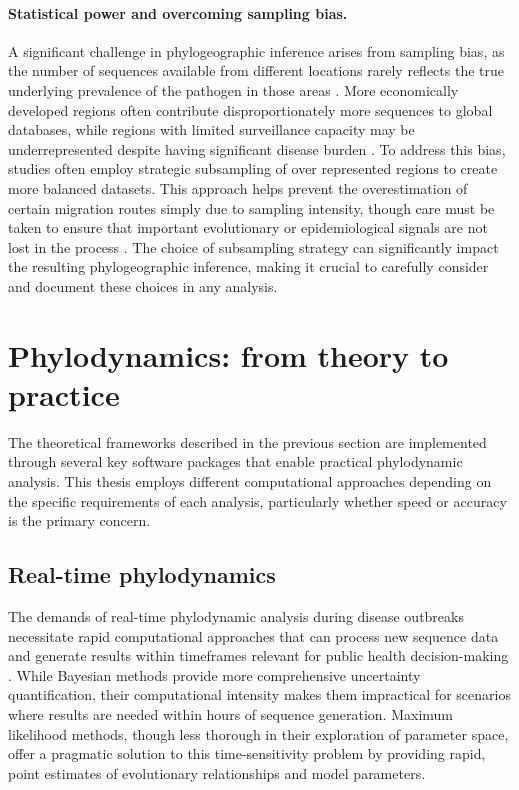 \paragraph*{Statistical power and overcoming sampling bias.}
A significant challenge in phylogeographic inference arises from sampling bias, as the number of sequences available from different locations rarely reflects the true underlying prevalence of the pathogen in those areas \citep{liu2022impact,layan2023impact}.
More economically developed regions often contribute disproportionately more sequences to global databases, while regions with limited surveillance capacity may be underrepresented despite having significant disease burden \citep{brito2022global}.
To address this bias, studies often employ strategic subsampling of over represented regions to create more balanced datasets.
This approach helps prevent the overestimation of certain migration routes simply due to sampling intensity, though care must be taken to ensure that important evolutionary or epidemiological signals are not lost in the process \citep{magee2018effects}.
The choice of subsampling strategy can significantly impact the resulting phylogeographic inference, making it crucial to carefully consider and document these choices in any analysis.

\section{Phylodynamics: from theory to practice}
The theoretical frameworks described in the previous section are implemented through several key software packages that enable practical phylodynamic analysis.
This thesis employs different computational approaches depending on the specific requirements of each analysis, particularly whether speed or accuracy is the primary concern.

\subsection{Real-time phylodynamics}
The demands of real-time phylodynamic analysis during disease outbreaks necessitate rapid computational approaches that can process new sequence data and generate results within timeframes relevant for public health decision-making \citep{bedford2020cryptic,worobey2020emergence}.
While Bayesian methods provide more comprehensive uncertainty quantification, their computational intensity makes them impractical for scenarios where results are needed within hours of sequence generation.
Maximum likelihood methods, though less thorough in their exploration of parameter space, offer a pragmatic solution to this time-sensitivity problem by providing rapid, point estimates of evolutionary relationships and model parameters.

